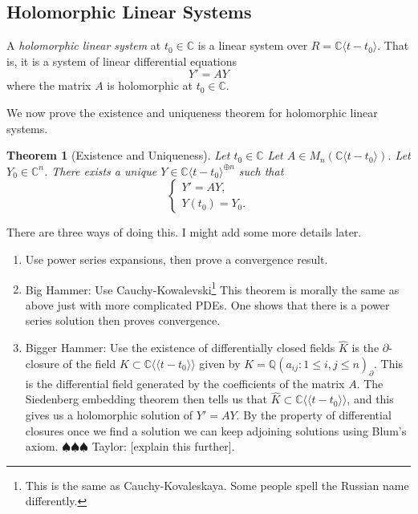 \documentclass[]{book}
\newcommand{\taylor}[1]{{\color{blue} \sf $\spadesuit\spadesuit\spadesuit$ Taylor: [#1]}}
\numberwithin{equation}{section}
\newtheorem{theorem}{Theorem}[subsection]
\theoremstyle{definition}
\theoremstyle{remark}
\newcommand{\QQ}{\mathbb{Q}}
\newcommand{\CC}{\mathbb{C}}
\newcommand{\llangle}{\langle \langle}
\newcommand{\rrangle}{\rangle \rangle}
\begin{document}
 \subsection{Holomorphic Linear Systems}
A \emph{holomorphic linear system} at $t_0 \in \CC$ is a linear system over $R= \CC\langle t -t_0\rangle$. 
That is, it is a system of linear differential equations 
$$ Y' = AY $$
where the matrix $A$ is holomorphic at $t_0\in \CC$.
 
 We now prove the existence and uniqueness theorem for holomorphic linear systems.
 
 \begin{theorem}[Existence and Uniqueness]
Let $t_0 \in \CC$
Let $A \in M_n(\CC\langle t-t_0 \rangle)$. 
Let $Y_0 \in \CC^n$. 
There exists a unique $Y \in \CC\langle t-t_0 \rangle^{\oplus n}$ such that 
$$\begin{cases}
	Y' = A Y,\\
	Y(t_0) = Y_0.
\end{cases}$$
 \end{theorem}
 There are three ways of doing this.
 I might add some more details later.
 \begin{enumerate}
 	\item Use power series expansions, then prove a convergence result. 
 	\item Big Hammer: Use Cauchy-Kowalevski\footnote{This is the same as Cauchy-Kovaleskaya.
 	Some people spell the Russian name differently. }
   This theorem is morally the same as above just with more complicated PDEs. 
   One shows that there is a power series solution then proves convergence.
    \item Bigger Hammer: Use the existence of differentially closed fields $\widehat{K}$ is the $\partial$-closure of the field $K \subset \CC\llangle t-t_0 \rrangle$ given by $K=\QQ(a_{ij} : 1\leq i,j \leq n )_{\partial}$.
    This is the differential field generated by the coefficients of the matrix $A$.
    The Siedenberg embedding theorem then tells us that $\widehat{K} \subset \CC\llangle t-t_0 \rrangle$, and this gives us a holomorphic solution of $Y'=AY$. 
    By the property of differential closures once we find a solution we can keep adjoining solutions using Blum's axiom. \taylor{explain this further}.
 \end{enumerate}
\end{document}
